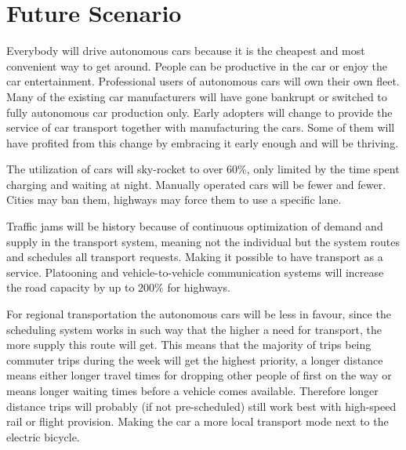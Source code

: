\documentclass[a4paper]{article}
\begin{document}
%

\section{Future Scenario}
\label{sec:future-scenario}

Everybody will drive autonomous cars because it is the cheapest and most convenient way to get around. People can be productive in the car or enjoy the car entertainment.
Professional users of autonomous cars will own their own fleet. Many of the existing car manufacturers will have gone bankrupt or switched to fully autonomous car production only. Early adopters will change to provide the service of car transport together with manufacturing the cars. Some of them will have profited from this change by embracing it early enough and will be thriving.

The utilization of cars will sky-rocket to over $60\%$, only limited by the time spent charging and waiting at night. Manually operated cars will be fewer and fewer. Cities may ban them, highways may force them to use a specific lane.

Traffic jams will be history because of continuous optimization of demand and supply in the transport system, meaning not the individual but the system routes and schedules all transport requests. Making it possible to have transport as a service. Platooning and vehicle-to-vehicle communication systems will increase the road capacity by up to $200\%$ for highways.

For regional transportation the autonomous cars will be less in favour, since the scheduling system works in such way that the higher a need for transport, the more supply this route will get. This means that the majority of trips being commuter trips during the week will get the highest priority, a longer distance means either longer travel times for dropping other people of first on the way or means longer waiting times before a vehicle comes available. Therefore longer distance trips will probably (if not pre-scheduled) still work best with high-speed rail or flight provision. Making the car a more local transport mode next to the electric bicycle. 
\end{document}

